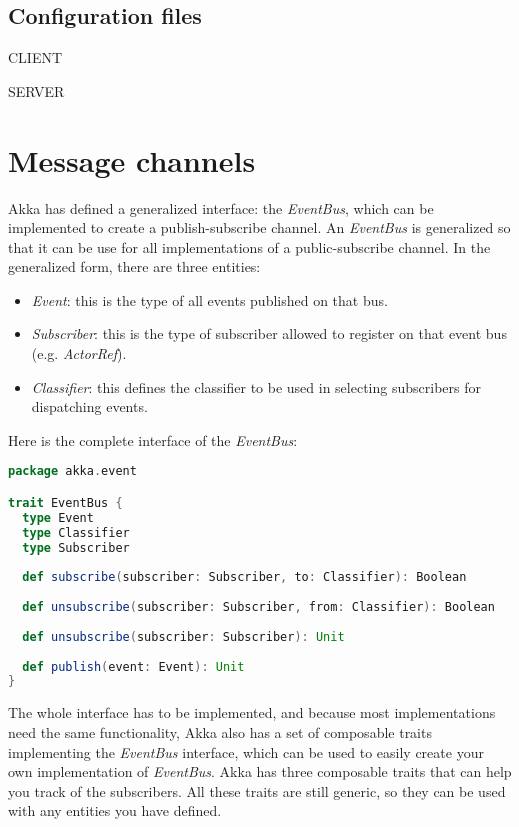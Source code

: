 \documentclass{article}
\begin{document}
\subsection{Configuration files}
CLIENT

\vskip 1cm
SERVER

\vskip 0.5cm

\section{Message channels}
Akka has defined a generalized interface: the \textit{EventBus}, which can be implemented to create a publish-subscribe channel. An \textit{EventBus} is generalized so that it can be use for all implementations of a public-subscribe channel. In the generalized form, there are three entities:
\begin{itemize}
\item \textit{Event}: this is the type of all events published on that bus.
\item \textit{Subscriber}: this is the type of subscriber allowed to register on that event bus (e.g. \textit{ActorRef}).
\item \textit{Classifier}: this defines the classifier to be used in selecting subscribers for dispatching events.
\end{itemize}
Here is the complete interface of the \textit{EventBus}:
\begin{lstlisting}[language=Scala]
package akka.event

trait EventBus {
  type Event
  type Classifier
  type Subscriber
  
  def subscribe(subscriber: Subscriber, to: Classifier): Boolean
  
  def unsubscribe(subscriber: Subscriber, from: Classifier): Boolean
                
  def unsubscribe(subscriber: Subscriber): Unit
  
  def publish(event: Event): Unit
}
\end{lstlisting}
\vskip 0.3cm
The whole interface has to be implemented, and because most implementations need the same functionality, Akka also has a set of composable traits implementing the \textit{EventBus} interface, which can be used to easily create your own implementation of \textit{EventBus}.
Akka has three composable traits that can help you track of the subscribers. All these traits are still generic, so they can be used with any entities you have defined.
\end{document}
